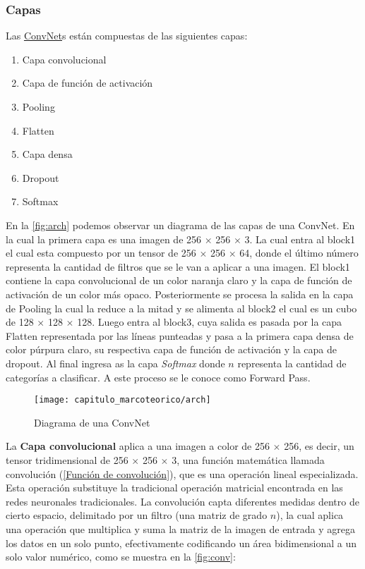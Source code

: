 \subsubsection{Capas}

Las \hyperlink{abbr}{ConvNet}s están compuestas de las siguientes capas:

\begin{enumerate}
    \item{Capa convolucional}
    \item{Capa de función de activación}
    \item{Pooling}
    \item{Flatten}
    \item{Capa densa}
    \item{Dropout}
    \item{Softmax}
\end{enumerate}

En la \autoref{fig:arch} podemos observar un diagrama de las capas de una
ConvNet. En la cual la primera capa es una imagen de 256 $\times$ 256 $\times$
3. La cual entra al block1 el cual esta compuesto por un tensor de 256 $\times$
256 $\times$ 64, donde el último número representa la cantidad de filtros que se
le van a aplicar a una imagen. El block1 contiene la capa convolucional de
un color naranja claro y la capa de función de activación de un color más opaco.
Posteriormente se procesa la salida en la capa de Pooling la cual la reduce a la
mitad y se alimenta al block2 el cual es un cubo de 128 $\times$ 128 $\times$
128. Luego entra al block3, cuya salida es pasada por la capa Flatten
representada por las líneas punteadas y pasa a la primera capa densa de color
púrpura claro, su respectiva capa de función de activación y la capa de dropout.
Al final ingresa as la capa \emph{Softmax} donde $n$ representa la cantidad de
categorías a clasificar. A este proceso se le conoce como Forward Pass.

\begin{figure}[H]
    \centering
    \texttt{[image: capitulo\_marcoteorico/arch]}
    \caption{Diagrama de una ConvNet}\label{fig:arch}
\end{figure}

La \textbf{Capa convolucional} aplica a una imagen a color de 256 $\times$ 256,
es decir, un tensor tridimensional de 256 $\times$ 256 $\times$ 3, una función
matemática llamada convolución (\autoref{Función de convolución}), que es una
operación lineal especializada. Esta operación substituye la tradicional
operación matricial encontrada en las redes neuronales tradicionales. La
convolución capta diferentes medidas dentro de cierto espacio, delimitado por un
filtro (una matriz de grado $n$), la cual aplica una operación que multiplica y
suma la matriz de la imagen de entrada y agrega los datos en un solo punto,
efectivamente codificando un área bidimensional a un solo valor numérico, como
se muestra en la \autoref{fig:conv}:

